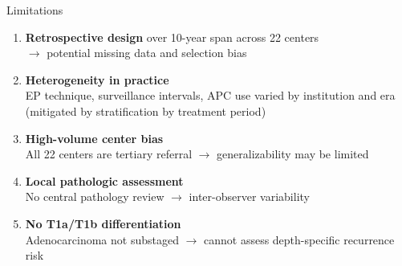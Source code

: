 \documentclass[aspectratio=169,10pt]{beamer}
\begin{document}
\begin{frame}{Limitations}
\begin{enumerate}
  \item \textbf{Retrospective design} over 10-year span across 22 centers\\
  $\to$ potential missing data and selection bias

  \vspace{4pt}
  \item \textbf{Heterogeneity in practice}\\
  EP technique, surveillance intervals, APC use varied by institution and era\\
  (mitigated by stratification by treatment period)

  \vspace{4pt}
  \item \textbf{High-volume center bias}\\
  All 22 centers are tertiary referral $\to$ generalizability may be limited

  \vspace{4pt}
  \item \textbf{Local pathologic assessment}\\
  No central pathology review $\to$ inter-observer variability

  \vspace{4pt}
  \item \textbf{No T1a/T1b differentiation}\\
  Adenocarcinoma not substaged $\to$ cannot assess depth-specific recurrence risk
\end{enumerate}
\end{frame}
\end{document}

